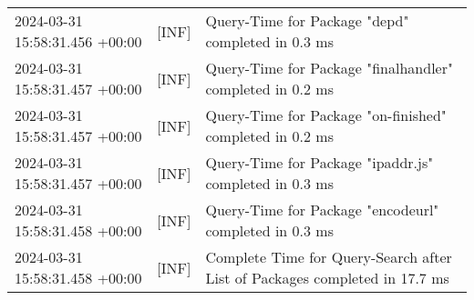 {{\begin{tabularx}{\textwidth}{|l|l|X|}
                    2024-03-31 15:58:31.456 +00:00 & [INF] & Query-Time for Package "depd" completed in 0.3 ms \\
                    2024-03-31 15:58:31.457 +00:00 & [INF] & Query-Time for Package "finalhandler" completed in 0.2 ms \\
                    2024-03-31 15:58:31.457 +00:00 & [INF] & Query-Time for Package "on-finished" completed in 0.2 ms \\
                    2024-03-31 15:58:31.457 +00:00 & [INF] & Query-Time for Package "ipaddr.js" completed in 0.3 ms \\
                    2024-03-31 15:58:31.458 +00:00 & [INF] & Query-Time for Package "encodeurl" completed in 0.3 ms \\
                    2024-03-31 15:58:31.458 +00:00 & [INF] & Complete Time for Query-Search after List of Packages completed in 17.7 ms \\
                    \hline
                \end{tabularx}
            }
        }

